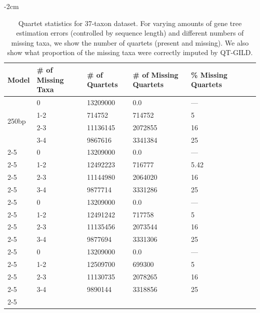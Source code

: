 \documentclass[10pt,a4paper]{article}
\begin{document}
\begin{appendices}
\begin{table}[H]
\begin{tabularx}{1.2\textwidth}{|X|X|X|X|X|X|X|}
\hline
    
\end{tabularx}

\end{table}
% 
\begin{table}[H]
  \small
  \centering
    \addtolength{\leftskip} {-2cm} %
    \addtolength{\rightskip}{-2cm}
    \caption{Quartet statistics for 37-taxon dataset. For varying amounts of gene tree estimation errors (controlled by sequence length) and different numbers of missing taxa, we show the number of quartets (present and missing). We also show what proportion of the missing taxa were correctly imputed by QT-GILD.}
    \label{tab:qstat-37-seq}
\begin{tabularx}{1.2\textwidth}{|X|X|X|X|X|X|X|}


\hline
Model & \# of Missing Taxa & \# of Quartets  &  \# of Missing Quartets & \% Missing Quartets \\
    \hline \hline
    \multirow{4}{0.25\textwidth}{250bp} 
    & 0   & 13209000 &    0.0       &   --- \\  \cline{2-5}
    & 1-2 & 714752   &	  714752    &	5\\ \cline{2-5}
    & 2-3 & 11136145 &    2072855	&	16 \\ \cline{2-5}
    & 3-4 & 9867616  &	  3341384   &	25 \\ \cline{2-5}
    \hline
    
    \multirow{4}{0.25\textwidth}{500bp} 
    & 0   & 13209000 &    0.0     & --- \\  \cline{2-5}
    & 1-2 & 12492223 &	716777    & 5.42\\ \cline{2-5}
    & 2-3 & 11144980 &	2064020   & 16 \\ \cline{2-5}
    & 3-4 & 9877714  &	3331286   & 25 \\ \cline{2-5}
    \hline
    
    \multirow{4}{0.25\textwidth}{1000bp} 
    & 0   & 13209000 &    0.0     & --- \\  \cline{2-5}
    & 1-2 & 12491242 &	717758   & 5 \\ \cline{2-5}
    & 2-3 & 11135456 &	2073544   & 16 \\ \cline{2-5}
    & 3-4 & 9877694  &	3331306  & 25 \\ \cline{2-5}
    \hline
    
    \multirow{4}{0.25\textwidth}{true} 
    & 0   & 13209000 &    0.0     & --- \\  \cline{2-5}
    & 1-2 & 12509700 &	699300   & 5 \\ \cline{2-5}
    & 2-3 & 11130735 &	2078265   & 16 \\ \cline{2-5}
    & 3-4 & 9890144  &	3318856  & 25 \\ \cline{2-5}
    \hline
    

\end{tabularx}
\end{table}
\end{appendices}
\end{document}
